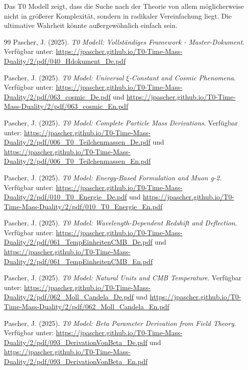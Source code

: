 	\begin{revolutionaer}
		Das T0 Modell zeigt, dass die Suche nach der Theorie von allem möglicherweise nicht in größerer Komplexität, sondern in radikaler Vereinfachung liegt. Die ultimative Wahrheit könnte außergewöhnlich einfach sein.
	\end{revolutionaer}
	
	\begin{thebibliography}{99}
		Pascher, J. (2025). \textit{T0 Modell: Vollständiges Framework - Master-Dokument}. Verfügbar unter: \url{https://jpascher.github.io/T0-Time-Mass-Duality/2/pdf/040_Hdokument_De.pdf}
		
		Pascher, J. (2025). \textit{T0 Model: Universal $\xi$-Constant and Cosmic Phenomena}. Verfügbar unter: \url{https://jpascher.github.io/T0-Time-Mass-Duality/2/pdf/063_cosmic_De.pdf} und \url{https://jpascher.github.io/T0-Time-Mass-Duality/2/pdf/063_cosmic_En.pdf}
		
		Pascher, J. (2025). \textit{T0 Model: Complete Particle Mass Derivations}. Verfügbar unter: \url{https://jpascher.github.io/T0-Time-Mass-Duality/2/pdf/006_T0_Teilchenmassen_De.pdf} und \url{https://jpascher.github.io/T0-Time-Mass-Duality/2/pdf/006_T0_Teilchenmassen_En.pdf}
		
		Pascher, J. (2025). \textit{T0 Model: Energy-Based Formulation and Muon g-2}. Verfügbar unter: \url{https://jpascher.github.io/T0-Time-Mass-Duality/2/pdf/010_T0_Energie_De.pdf} und \url{https://jpascher.github.io/T0-Time-Mass-Duality/2/pdf/010_T0_Energie_En.pdf}
		
		Pascher, J. (2025). \textit{T0 Model: Wavelength-Dependent Redshift and Deflection}. Verfügbar unter: \url{https://jpascher.github.io/T0-Time-Mass-Duality/2/pdf/061_TempEinheitenCMB_De.pdf} und \url{https://jpascher.github.io/T0-Time-Mass-Duality/2/pdf/061_TempEinheitenCMB_En.pdf}
		
		Pascher, J. (2025). \textit{T0 Model: Natural Units and CMB Temperature}. Verfügbar unter: \url{https://jpascher.github.io/T0-Time-Mass-Duality/2/pdf/062_Moll_Candela_De.pdf} und \url{https://jpascher.github.io/T0-Time-Mass-Duality/2/pdf/062_Moll_Candela_En.pdf}
		
		Pascher, J. (2025). \textit{T0 Model: Beta Parameter Derivation from Field Theory}. Verfügbar unter: \url{https://jpascher.github.io/T0-Time-Mass-Duality/2/pdf/093_DerivationVonBeta_De.pdf} und \url{https://jpascher.github.io/T0-Time-Mass-Duality/2/pdf/093_DerivationVonBeta_En.pdf}
		

\end{thebibliography}
